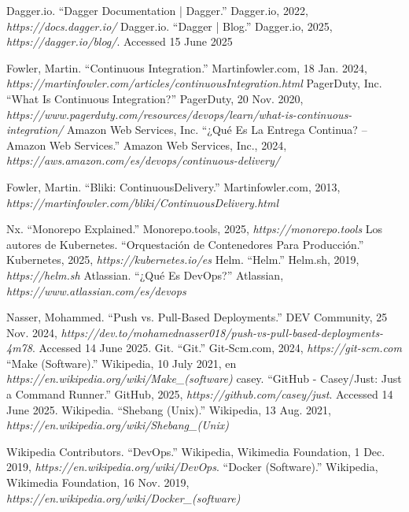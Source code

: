 

\begin{thebibliography}{99}
 Dagger.io. ``Dagger Documentation | Dagger.'' Dagger.io, 2022, {\it https://docs.dagger.io/}
 Dagger.io. “Dagger | Blog.” Dagger.io, 2025, {\it https://dagger.io/blog/}. Accessed 15 June 2025

 Fowler, Martin. ``Continuous Integration.'' Martinfowler.com, 18 Jan. 2024, {\it https://martinfowler.com/articles/continuousIntegration.html}
 PagerDuty, Inc. ``What Is Continuous Integration?'' PagerDuty, 20 Nov. 2020, {\it https://www.pagerduty.com/resources/devops/learn/what-is-continuous-integration/}
 Amazon Web Services, Inc. ``¿Qué Es La Entrega Continua? – Amazon Web Services.'' Amazon Web Services, Inc., 2024, {\it https://aws.amazon.com/es/devops/continuous-delivery/}

 Fowler, Martin. ``Bliki: ContinuousDelivery.'' Martinfowler.com, 2013, {\it https://martinfowler.com/bliki/ContinuousDelivery.html}

 Nx. ``Monorepo Explained.'' Monorepo.tools, 2025, {\it https://monorepo.tools}
 Los autores de Kubernetes. ``Orquestación de Contenedores Para Producción.'' Kubernetes, 2025, {\it https://kubernetes.io/es}
 Helm. ``Helm.'' Helm.sh, 2019, {\it https://helm.sh}
 Atlassian. ``¿Qué Es DevOps?'' Atlassian, {\it https://www.atlassian.com/es/devops}

 Nasser, Mohammed. ``Push vs. Pull-Based Deployments.'' DEV Community, 25 Nov. 2024, {\it https://dev.to/mohamednasser018/push-vs-pull-based-deployments-4m78}. Accessed 14 June 2025.
 Git. ``Git.'' Git-Scm.com, 2024, {\it https://git-scm.com}
 ``Make (Software).'' Wikipedia, 10 July 2021, en {\it https://en.wikipedia.org/wiki/Make\_(software)}
 casey. ``GitHub - Casey/Just: Just a Command Runner.'' GitHub, 2025, {\it https://github.com/casey/just}. Accessed 14 June 2025.
 Wikipedia. ``Shebang (Unix).'' Wikipedia, 13 Aug. 2021, {\it https://en.wikipedia.org/wiki/Shebang\_(Unix)}

 Wikipedia Contributors. ``DevOps.'' Wikipedia, Wikimedia Foundation, 1 Dec. 2019, {\it https://en.wikipedia.org/wiki/DevOps}.
 ``Docker (Software).'' Wikipedia, Wikimedia Foundation, 16 Nov. 2019, {\it https://en.wikipedia.org/wiki/Docker\_(software)}


\end{thebibliography}
